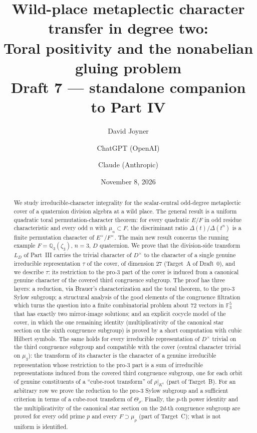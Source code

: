 \documentclass[11pt]{article}
\title{Wild-place metaplectic character transfer in degree two:\\
Toral positivity and the nonabelian gluing problem\\[0.4em]
\normalsize Draft 7 --- standalone companion to Part IV}
\author{David Joyner \and ChatGPT (OpenAI) \and Claude (Anthropic)}
\date{November 8, 2026}
\newcommand{\Q}{\mathbb Q}
\newcommand{\Fq}{\mathbb F}
\theoremstyle{plain}
\theoremstyle{definition}
\begin{document}
\maketitle
\begin{abstract}
We study irreducible-character integrality for the scalar-central
odd-degree metaplectic cover of a quaternion division algebra at a
wild place.  The general result is a uniform quadratic toral
permutation-character theorem: for every quadratic $E/F$ in odd
residue characteristic and every odd $n$ with $\mu_n\subset F$, the
discriminant ratio $\Delta(t)/\Delta(t^n)$ is a finite permutation
character of $E^\times/F^\times$.  The main new result concerns the
running example $F=\Q_3(\zeta_3)$, $n=3$, $D$ quaternion.  We prove
that the division-side transform $L_D$ of Part~III carries the
trivial character of $D^\times$ to the character of a single genuine
irreducible representation $\tau$ of the cover, of dimension $27$
(Target~A of Draft~0), and we describe $\tau$: its restriction to the
pro-$3$ part of the cover is induced from a canonical genuine
character of the covered third congruence subgroup.  The proof has
three layers: a reduction, via Brauer's characterization and the
toral theorem, to the pro-$3$ Sylow subgroup; a structural analysis
of the good elements of the congruence filtration which turns the
question into a finite combinatorial problem about $72$ vectors in
$\Fq_3^5$ that has exactly two mirror-image solutions; and an
explicit cocycle model of the cover, in which the one remaining
identity (multiplicativity of the canonical star section on the sixth
congruence subgroup) is proved by a short computation with cubic
Hilbert symbols.  The same holds for every irreducible representation of $D^\times$
trivial on the third congruence subgroup and compatible with the cover
(central character trivial on $\mu_3$): the transform of its
character is the character of a genuine irreducible representation
whose restriction to the pro-$3$ part is a sum of irreducible
representations induced from the covered third congruence subgroup,
one for each orbit of genuine constituents of a ``cube-root transform''
of $\rho|_{K^1}$ (part of Target~B).  For an arbitrary row
we prove the reduction to the pro-$3$ Sylow subgroup and a sufficient
criterion in terms of a cube-root transform of $\Theta_\rho$.  Finally,
the $p$-th power identity and the multiplicativity of the canonical star
section on the $2d$-th congruence subgroup are proved for every odd prime
$p$ and every $F\supset\mu_p$ (part of Target~C); what is not uniform is
identified.
\end{abstract}
\tableofcontents
\end{document}
